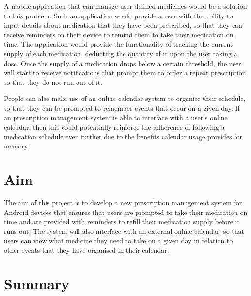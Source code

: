 \documentclass{l4proj}
\begin{document}
A mobile application that can manage user-defined medicines would be a solution to this problem. Such an application would provide a user with the ability to input details about medication that they have been prescribed, so that they can receive reminders on their device to remind them to take their medication on time. The application would provide the functionality of tracking the current supply of each medication, deducting the quantity of it upon the user taking a dose. Once the supply of a medication drops below a certain threshold, the user will start to receive notifications that prompt them to order a repeat prescription so that they do not run out of it.

People can also make use of an online calendar system to organise their schedule, so that they can be prompted to remember events that occur on a given day. If an prescription management system is able to interface with a user's online calendar, then this could potentially reinforce the adherence of following a medication schedule even further due to the benefits calendar usage provides for memory.

\section{Aim}

The aim of this project is to develop a new prescription management system for Android devices that ensures that users are prompted to take their medication on time and are provided with reminders to refill their medication supply before it runs out. The system will also interface with an external online calendar, so that users can view what medicine they need to take on a given day in relation to other events that they have organised in their calendar. 

\section{Summary}
\end{document}
